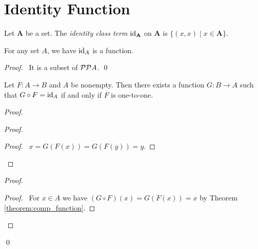 \section{Identity Function}

\begin{definition}
    Let $\mathbf{A}$ be a set. The \emph{identity class term} $\mathrm{id}_{\mathbf{A}}$ on $\mathbf{A}$ is
    $\{ (x,x) \mid x \in \mathbf{A} \}$.
\end{definition}

\begin{theorem}
    For any set $A$, we have $\mathrm{id}_{A}$ is a function.
\end{theorem}

\begin{proof}
    \pf\ It is a subset of $\mathcal{P} \mathcal{P} A$. \qed
\end{proof}

\begin{theorem}
    Let $F : A \rightarrow B$ and $A$ be nonempty. Then there exists a function
    $G : B \rightarrow A$ such that $G \circ F = \mathrm{id}_{A}$ if and only if $F$
    is one-to-one.
\end{theorem}

\begin{proof}
    \pf
    \begin{proof}
        \begin{proof}
            \pf\ $x = G(F(x)) = G(F(y)) = y$.
        \end{proof}
    \end{proof}
    \begin{proof}
        \begin{proof}
            \pf\ For $x \in A$ we have $(G \circ F)(x) = G(F(x)) = x$ by Theorem \ref{theorem:comp_function}.
        \end{proof}
    \end{proof}
    \qed
\end{proof}

